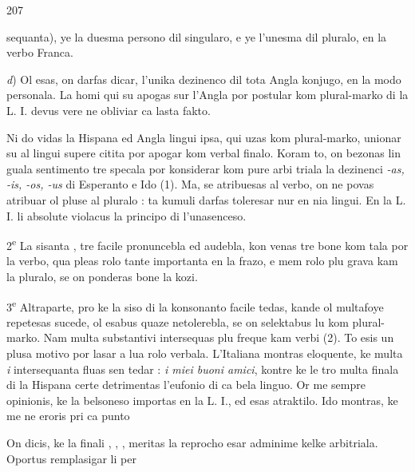 \begin{VUpage}[211]{207}
\VUasterismo{125.14mm}

\VUcontinue
sequanta), ye la duesma persono dil singularo, e ye l'unesma\nl
dil pluralo, en la verbo Franca.

\textit{d}) Ol esas, on darfas dicar, l'unika dezinenco dil tota\nl
Angla konjugo, en la modo personala. La homi qui su\nl
apogas sur l'Angla por postular  kom plural-marko di la\nl
L. I. devus vere ne obliviar ca lasta fakto.

Ni do vidas la Hispana ed Angla lingui ipsa, qui uzas \nl
kom plural-marko, unionar su al lingui supere citita por\nl
apogar  kom verbal finalo. Koram to, on bezonas lin\cc
guala sentimento tre specala por konsiderar kom pure arbi\cc
triala la dezinenci \textit{-as, -is, -os, -us} di Esperanto e Ido (1).\nl
Ma, se  atribuesas al verbo, on ne povas atribuar ol pluse\nl
al pluralo : ta kumuli darfas toleresar nur en nia lingui.\nl
En la L. I. li absolute violacus la principo di l'unasenceso.\parplein

2\textsuperscript{e} La sisanta , tre facile pronuncebla ed audebla, kon\cc
venas tre bone kom tala por la verbo, qua pleas rolo tante\nl
importanta en la frazo, e mem rolo plu grava kam la pluralo,\nl
se on ponderas bone la kozi.

3\textsuperscript{e} Altraparte, pro ke la siso di la konsonanto  facile\nl
tedas, kande ol multafoye repetesas sucede, ol esabus quaze\nl
netolerebla, se on selektabus lu kom plural-marko. Nam\nl
multa substantivi intersequas plu freque kam verbi (2).\nl
To esis un plusa motivo por lasar a  lua rolo verbala.\nl
L'Italiana montras eloquente, ke multa \textit{i} intersequanta\nl
fluas sen tedar : \textit{i miei buoni amici}, kontre ke le tro multa \nl
finala di la Hispana certe detrimentas l'eufonio di ca bela\nl
linguo. Or me sempre opinionis, ke la belsoneso importas\nl
en la L. I., ed esas atraktilo. Ido montras, ke me ne eroris\nl
pri ca punto

\VUsaut{7.04mm}
On dicis, ke la finali , , ,  meritas la reprocho\nl
esar adminime kelke arbitriala. Oportus remplasigar li per\parplein
\end{VUpage}

